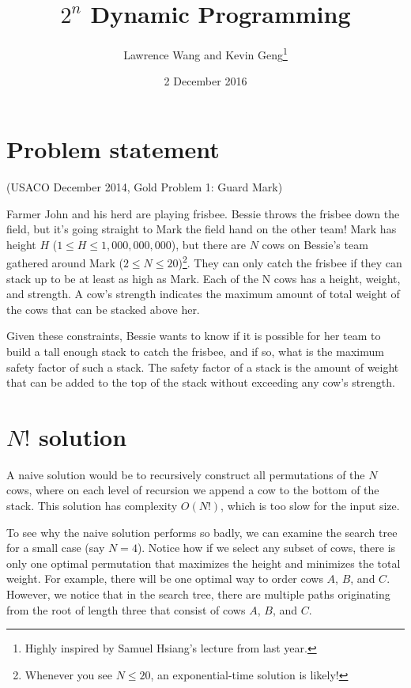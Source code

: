 \documentclass{article}
\title{$2^n$ Dynamic Programming}
\author{Lawrence Wang and Kevin Geng\footnote{Highly inspired by Samuel Hsiang's lecture from last year.}}
\date{2 December 2016}
\begin{document}
\maketitle

\section{Problem statement}

(USACO December 2014, Gold Problem 1: Guard Mark)

Farmer John and his herd are playing frisbee. Bessie throws the frisbee down the field, but it's going straight to Mark the field hand on the other team!  Mark has height $H$ ($1 \leq H \leq 1,000,000,000$), but there are $N$ cows on Bessie's team gathered around Mark ($2 \leq N \leq 20$)\footnote{Whenever you see $N \leq 20$, an exponential-time solution is likely!}. They can only catch the frisbee if they can stack up to be at least as high as Mark.  Each of the N cows has a height, weight, and strength. A cow's strength indicates the maximum amount of total weight of the cows that can be stacked above her.

Given these constraints, Bessie wants to know if it is possible for her team to build a tall enough stack to catch the frisbee, and if so, what is the maximum safety factor of such a stack.  The safety factor of a stack is the amount of weight that can be added to the top of the stack without exceeding any cow's strength.

\section{$N!$ solution}

A naive solution would be to recursively construct all permutations of the $N$ cows, where on each level of recursion we append a cow to the bottom of the stack. This solution has complexity $O(N!)$, which is too slow for the input size. 

To see why the naive solution performs so badly, we can examine the search tree for a small case (say $N=4$). Notice how if we select any subset of cows, there is only one optimal permutation that maximizes the height and minimizes the total weight. For example, there will be one optimal way to order cows $A$, $B$, and $C$. However, we notice that in the search tree, there are multiple paths originating from the root of length three that consist of cows $A$, $B$, and $C$.
\end{document}
